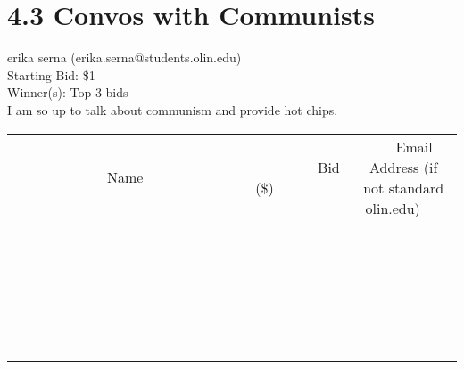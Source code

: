 \documentclass[11pt]{article}
\begin{document}
\section*{4.3 Convos with Communists}
erika serna (erika.serna@students.olin.edu) \\
Starting Bid: \$1 \\
Winner(s): 
Top 3 bids \\
I am so up to talk about communism and provide hot chips. \\[6ex]
\begin{tabular}{c c c}
~~~~~~~~~~~~~Name~~~~~~~~~~~~~ & ~~~~~~~~~Bid (\$)~~~~~~~~~ & ~~~Email Address (if not standard olin.edu)~~~ \\
 & & \\
\hline
 & & \\
\hline
 & & \\
\hline
 & & \\
\hline
 & & \\
\hline
 & & \\
\hline
 & & \\
\hline
 & & \\
\hline
 & & \\
\hline
 & & \\
\hline
 & & \\
\hline
 & & \\
\hline
 & & \\
\hline
 & & \\
\hline
 & & \\
\hline
 & & \\
\hline
 & & \\
\hline
 & & \\
\hline
 & & \\
\hline
 & & \\
\hline
 & & \\
\hline
 & & \\
\hline
 & & \\
\hline
 & & \\
\hline
 & & \\
\hline
 & & \\
\hline
\end{tabular}
\clearpage
\end{document}
